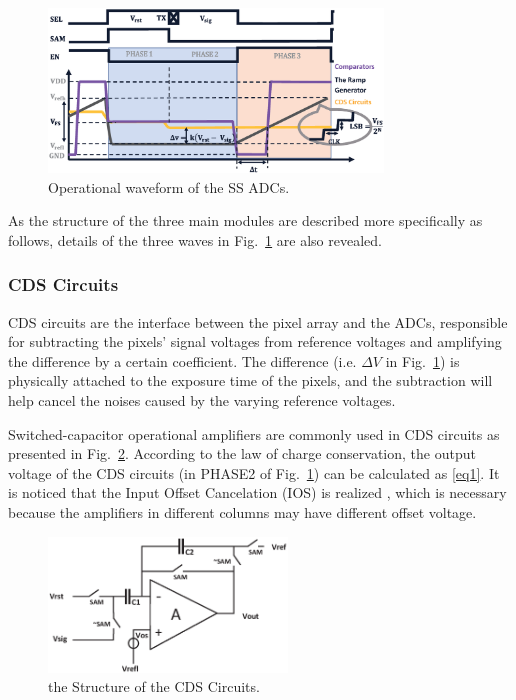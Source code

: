 \documentclass[conference]{IEEEtran}
\begin{document}
\begin{figure}[htbp]
	\centerline{\includegraphics[width=3.5in]{./Figures/SSWAVE.eps}}
	\caption{Operational waveform of the SS ADCs.}
	\label{SSWAVE}
\end{figure}

As the structure of the three main modules are described more specifically as follows, details of the three waves in Fig.~\ref{SSWAVE} are also revealed.

\subsubsection{CDS Circuits}

CDS circuits are the interface between the pixel array and the ADCs, responsible for subtracting the pixels’ signal voltages from reference voltages and 
amplifying the difference by a certain coefficient. The difference (i.e. $\Delta{V}$ in Fig.~\ref{SSWAVE}) is physically attached to the exposure time of the pixels, 
and the subtraction will help cancel the noises caused by the varying reference voltages. 

Switched-capacitor operational amplifiers are commonly used in CDS circuits as presented in Fig.~\ref{CDS}. According to the law of charge conservation, 
the output voltage of the CDS circuits (in PHASE2 of Fig.~\ref{SSWAVE}) can be calculated as \eqref{eq1}. It is noticed that the Input Offset Cancelation (IOS) is realized \cite{razavi_design_1992}, 
which is necessary because the amplifiers in different columns may have different offset voltage.

\begin{figure}[htbp]
	\centerline{\includegraphics[width=2.5in]{./Figures/CDS.eps}}
	\caption{the Structure of the CDS Circuits.}
	\label{CDS}
\end{figure} 
\end{document}
